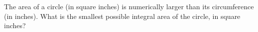 The area of a circle (in square inches) is numerically larger than its circumference (in inches). What is the smallest possible integral area of the circle, in square inches?
